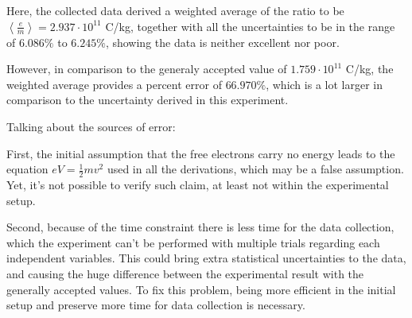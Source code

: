 \documentclass{article}
\begin{document}
\hfil

Here, the collected data derived a weighted average of the ratio to be $\left<\frac{e}{m}\right> = 2.937\cdot 10^{11}$ C/kg, together with all the uncertainties to be in the range of $6.086\%$ to $6.245\%$, showing the data is neither excellent nor poor.

However, in comparison to the generaly accepted value of $1.759\cdot 10^{11}$ C/kg, the weighted average provides a percent error of $66.970\%$, which is a lot larger in comparison to the uncertainty derived in this experiment.

\hfil

Talking about the sources of error:

First, the initial assumption that the free electrons carry no energy leads to the equation $e V=\frac{1}{2}mv^2$ used in all the derivations, which may be a false assumption. Yet, it's not possible to verify such claim, at least not within the experimental setup.

Second, because of the time constraint there is less time for the data collection, which the experiment can't be performed with multiple trials regarding each independent variables. This could bring extra statistical uncertainties to the data, and causing the huge difference between the experimental result with the generally accepted values. To fix this problem, being more efficient in the initial setup and preserve more time for data collection is necessary.
\end{document}
